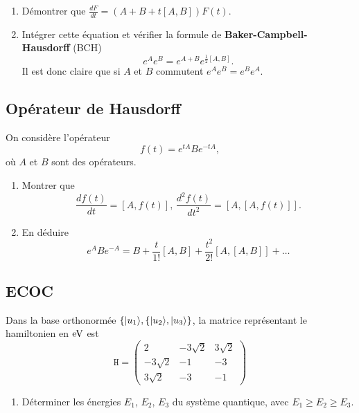 \begin{itemize}
\begin{enumerate}
\item Démontrer que $\frac{dF}{dt}=(A+B+t[A,B])F(t)$.

\item Intégrer cette équation et vérifier la formule de
\textbf{Baker-Campbell-Hausdorff}  (BCH)
\begin{equation}
e^{A}e^{B}=e^{A+B}e^{\frac{1}{2}[A,B]}.
\end{equation}
Il est donc claire que si $A$ et $B$ commutent $e^{A}e^{B}=e^{B}e^{A}$.
\end{enumerate}

\subsection{Opérateur de Hausdorff}

\label{sec:IdOp1} On considère l'opérateur
\begin{equation}
f(t)=e^{tA}Be^{-tA},
\end{equation}
où $A$ et $B$ sont des opérateurs.

\begin{enumerate}
\item Montrer que%
\begin{equation}
\frac{df(t)}{dt}=[A,f(t)],\,\frac{d^2f(t)}{dt^2}=[A,[A,f(t)]].
\end{equation}

\item En déduire
\begin{equation}
e^{A}Be^{-A}=B+\frac{t}{1!}[A,B]+\frac{t^{2}}{2!}[A,[A,B]]+\ldots
\end{equation}

\end{enumerate}

\subsection{ECOC}
\label{ECOC}
Dans la base orthonormée $\{\vert u_1\rangle,\{\vert u_2\rangle,\vert u_3\rangle\}$, la matrice
représentant le hamiltonien en $\operatorname{eV}$ est%
\begin{equation}
\mathtt{H}=\begin{pmatrix}
2 & -3\sqrt{2} & 3\sqrt{2}\\
-3\sqrt{2} & -1 & -3\\
3\sqrt{2} & -3 & -1
\end{pmatrix}
\end{equation}

\begin{enumerate}
\item Déterminer les énergies $E_1$, $E_{2}$, $E_3$ du système quantique,
avec $E_1\geq E_{2}\geq E_3$.


\end{enumerate}
\end{itemize}
